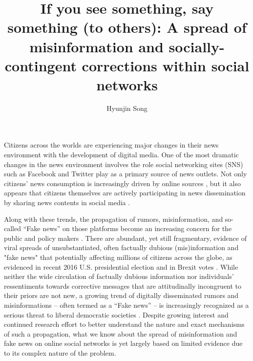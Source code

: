 \documentclass[man, 12pt, a4paper]{apa6}
\title{If you see something, say something (to others): A spread of misinformation and socially-contingent corrections within social networks}
\author{Hyunjin Song}
\affiliation{Department of Communication, University of Vienna, Austria}
\begin{document}
\maketitle
Citizens across the worlds are experiencing major changes in their news environment with the development of digital media. One of the most dramatic changes in the news environment involves the role social networking sites (SNS) such as Facebook and Twitter play as a primary source of news outlets. Not only citizens' news consumption is increasingly driven by online sources \parencite{shearer2017news}, but it also appears that citizens themselves are actively participating in news dissemination by sharing news contents in social media \parencite[e.g.,][]{weeks2013dissemination}. 

Along with these trends, the propagation of rumors, misinformation, and so-called \enquote{Fake news} on those platforms become an increasing concern for the public and policy makers \parencite{allcott2017social}. There are abundant, yet still fragmentary, evidence of viral spreads of unsubstantiated, often factually dubious (mis)information and "fake news" that potentially affecting millions of citizens across the globe, as evidenced in recent 2016 U.S. presidential election \parencite{guess2018selective, giglietto2016fakes, allcott2017social} and in Brexit votes \parencite{nyt_2017}. While neither the wide circulation of factually dubious information nor individuals' ressentiments towards corrective messages that are attitudinally incongruent to their priors are not new, a growing trend of digitally disseminated rumors and misinformations -- often termed as a \enquote{Fake news} -- is increasingly recognized as a serious threat to liberal democratic societies \parencite{allcott2017social,LEWANDOWSKY_JARMC2017}. Despite growing interest and continued research effort to better understand the nature and exact mechanisms of such a propagation, what we know about the spread of misinformation and fake news on online social networks is yet largely based on limited evidence due to its complex nature of the problem.
\end{document}
